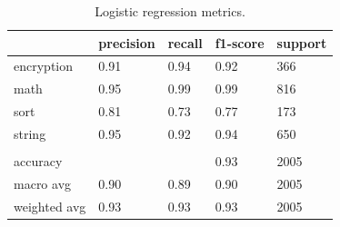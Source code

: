 \documentclass[11pt]{article}
\begin{document}
\begin{table}[h]
\centering
\begin{tabular}{|l|l|l|l|l|}
\hline
             & precision & recall & f1-score & support \\ \hline
encryption   & 0.91      & 0.94   & 0.92     & 366     \\ \hline
math         & 0.95      & 0.99   & 0.99     & 816     \\ \hline
sort         & 0.81      & 0.73   & 0.77     & 173     \\ \hline
string       & 0.95      & 0.92   & 0.94     & 650     \\ \hline
             &           &        &          &         \\ \hline
accuracy     &           &        & 0.93     & 2005    \\ \hline
macro avg    & 0.90      & 0.89   & 0.90     & 2005    \\ \hline
weighted avg & 0.93      & 0.93   & 0.93     & 2005    \\ \hline
\end{tabular}
\caption{Logistic regression metrics.}
\end{table}
\end{document}
